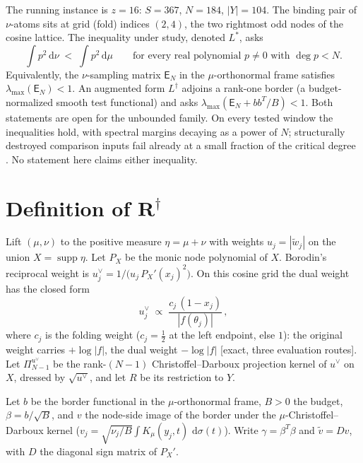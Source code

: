 \documentclass[11pt]{article}
\theoremstyle{remark}
\newcommand{\E}{\mathsf{E}}
\newcommand{\Ld}{L^{\dagger}}
\newcommand{\Ls}{L^{*}}
\newcommand{\dd}{\,\mathrm{d}}
\newcommand{\gr}[1]{\textnormal{\small[#1]}}
\begin{document}
The running instance is $z=16$: $S=367$, $N=184$, $|Y|=104$.  The
binding pair of $\nu$-atoms sits at grid (fold) indices $(2,4)$,
the two rightmost odd nodes of the cosine lattice.  The inequality
under study, denoted $\Ls$, asks
\[
\int p^{2}\dd\nu \;<\; \int p^{2}\dd\mu
\qquad\text{for every real polynomial }p\neq 0\text{ with }
\deg p<N.
\]
Equivalently, the $\nu$-sampling matrix $\E_{N}$ in the
$\mu$-orthonormal frame satisfies $\lambda_{\max}(\E_{N})<1$.  An
augmented form $\Ld$ adjoins a rank-one border (a budget-normalized
smooth test functional) and asks $\lambda_{\max}(\E_{N}+bb^{T}/B)<1$.
Both statements are open for the unbounded family.  On every tested
window the inequalities hold, with spectral margins decaying as a
power of $N$; structurally destroyed comparison inputs fail already
at a small fraction of the critical degree \cite{lstar-note}.  No
statement here claims either inequality.

\section{Definition of \texorpdfstring{$\boldsymbol{R^{\dagger}}$}{R-dagger}}
\label{sec:def}

Lift $(\mu,\nu)$ to the positive measure $\eta=\mu+\nu$ with weights
$u_{j}=|\widetilde w_{j}|$ on the union $X=\operatorname{supp}\eta$.
Let $P_{X}$ be the monic node polynomial of $X$.  Borodin's reciprocal
weight \cite{Borodin2002} is
$u^{\vee}_{j}=1\bigl/(u_{j}\,P_{X}'(x_{j})^{2}\bigr)$.  On this
cosine grid the dual weight has the closed form
\begin{equation}\label{eq:uvee}
u^{\vee}_{j}\;\propto\;
\frac{c_{j}\,(1-x_{j})}{|f(\theta_{j})|}\,,
\end{equation}
where $c_{j}$ is the folding weight ($c_{j}=\tfrac12$ at the left
endpoint, else $1$): the original weight carries $+\log|f|$, the dual
weight $-\log|f|$ \gr{exact, three evaluation routes}.  Let
$\Pi_{N-1}^{u^{\vee}}$ be the rank-$(N-1)$ Christoffel--Darboux
projection kernel of $u^{\vee}$ on $X$, dressed by
$\sqrt{u^{\vee}}$, and let $R$ be its restriction to $Y$.

Let $b$ be the border functional in the $\mu$-orthonormal frame,
$B>0$ the budget, $\beta=b/\sqrt{B}$, and $v$ the node-side image of
the border under the $\mu$-Christoffel--Darboux kernel
($v_{j}=\sqrt{\nu_{j}/B}\int K_{\mu}(y_{j},t)\,\dd\sigma(t)$).  Write
$\gamma=\beta^{T}\beta$ and $\widetilde v=Dv$, with $D$ the diagonal
sign matrix of $P_{X}'$.
\end{document}
